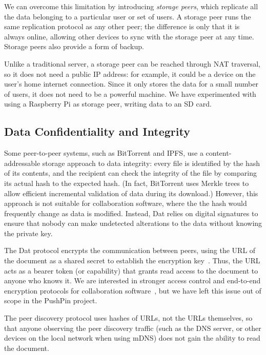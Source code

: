 \documentclass[sigplan,10pt]{acmart}
\begin{document}
We can overcome this limitation by introducing \emph{storage peers}, which replicate all the data belonging to a particular user or set of users.
A storage peer runs the same replication protocol as any other peer; the difference is only that it is always online, allowing other devices to sync with the storage peer at any time.
Storage peers also provide a form of backup.

Unlike a traditional server, a storage peer can be reached through NAT traversal, so it does not need a public IP address: for example, it could be a device on the user's home internet connection.
Since it only stores the data for a small number of users, it does not need to be a powerful machine.
We have experimented with using a Raspberry Pi as storage peer, writing data to an SD card.

\subsection{Data Confidentiality and Integrity}

Some peer-to-peer systems, such as BitTorrent and IPFS, use a content-addressable storage approach to data integrity: every file is identified by the hash of its contents, and the recipient can check the integrity of the file by comparing its actual hash to the expected hash.
(In fact, BitTorrent uses Merkle trees \cite{Merkle:1987} to allow efficient incremental validation of data during its download.)
However, this approach is not suitable for collaboration software, where the the hash would frequently change as data is modified.
Instead, Dat relies on digital signatures to ensure that nobody can make undetected alterations to the data without knowing the private key.

The Dat protocol encrypts the communication between peers, using the URL of the document as a shared secret to establish the encryption key~\cite{HowDatWorks}.
Thus, the URL acts as a bearer token (or capability) that grants read access to the document to anyone who knows it.
We are interested in stronger access control and end-to-end encryption protocols for collaboration software~\cite{Kleppmann:2018tk}, but we have left this issue out of scope in the PushPin project.

The peer discovery protocol uses hashes of URLs, not the URLs themselves, so that anyone observing the peer discovery traffic (such as the DNS server, or other devices on the local network when using mDNS) does not gain the ability to read the document.
\end{document}
